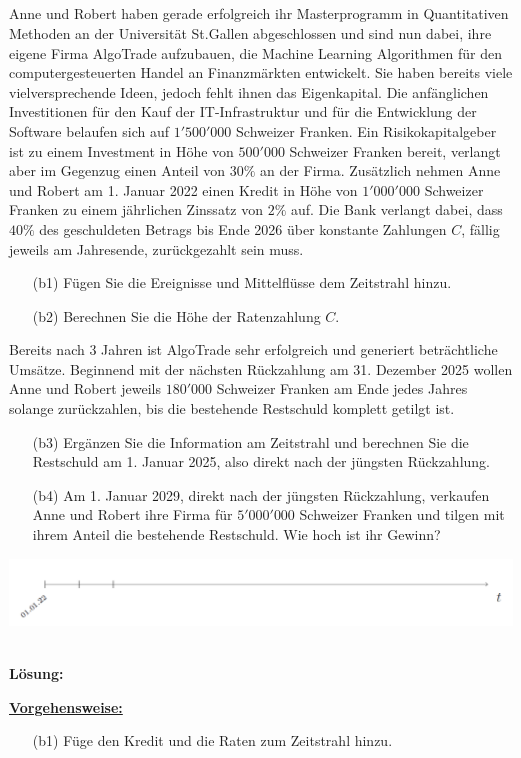 \subsection*{}
Anne und Robert haben gerade erfolgreich ihr Masterprogramm in Quantitativen
Methoden an der Universität St.Gallen abgeschlossen und sind nun dabei, ihre eigene
Firma AlgoTrade aufzubauen, die Machine Learning Algorithmen für den computergesteuerten Handel an Finanzmärkten entwickelt. Sie haben bereits viele vielversprechende Ideen, jedoch fehlt ihnen das Eigenkapital. Die anfänglichen Investitionen für den Kauf der IT-Infrastruktur und für die Entwicklung der Software belaufen sich auf $1'500'000$ Schweizer Franken.
Ein Risikokapitalgeber ist zu einem Investment in Höhe von $500'000$ Schweizer Franken bereit, verlangt aber im Gegenzug einen Anteil von $30 \%$ an der Firma.
Zusätzlich nehmen Anne und Robert am 1. Januar 2022 einen Kredit in Höhe von $1'000'000$ Schweizer Franken zu einem jährlichen Zinssatz von $2 \% $ auf.
Die Bank verlangt dabei, dass $40 \%$ des geschuldeten Betrags bis Ende 2026 über konstante Zahlungen $C$, fällig jeweils am Jahresende, zurückgezahlt sein muss.
\begin{enumerate}
	\item[(b1)] Fügen Sie die Ereignisse und Mittelflüsse dem Zeitstrahl hinzu.
	\item[(b2)] Berechnen Sie die Höhe der Ratenzahlung $C$.
\end{enumerate}
Bereits nach 3 Jahren ist AlgoTrade sehr erfolgreich und generiert beträchtliche Umsätze. Beginnend mit der nächsten Rückzahlung am 31. Dezember 2025 wollen Anne und Robert jeweils $180'000$ Schweizer Franken am Ende jedes Jahres solange zurückzahlen, bis die bestehende Restschuld komplett getilgt ist.
\begin{enumerate}
	\item[(b3)] Ergänzen Sie die Information am Zeitstrahl und berechnen Sie die Restschuld am 1. Januar 2025, also direkt nach der jüngsten Rückzahlung.
	\item[(b4)] Am 1. Januar 2029, direkt nach der jüngsten Rückzahlung, verkaufen Anne und Robert	ihre Firma für $5'000'000$ Schweizer Franken und tilgen mit ihrem Anteil die bestehende	Restschuld. Wie hoch ist ihr Gewinn?
\end{enumerate}
\begin{center}
	\includegraphics[scale=0.45]{pictures/zeitstrahl_1_b}
\end{center}
\ \\
\textbf{Lösung:}
\begin{mdframed}
\underline{\textbf{Vorgehensweise:}}
\begin{enumerate}
\item[(b1)] Füge den Kredit und die Raten zum Zeitstrahl hinzu.
\end{enumerate}
\end{mdframed}

